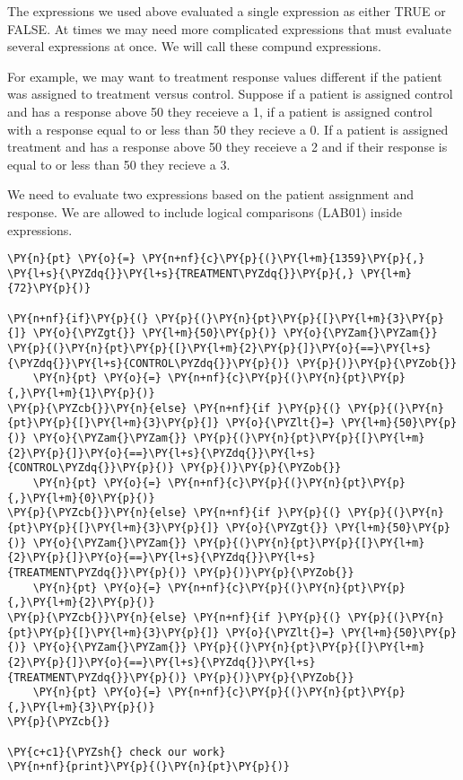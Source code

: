 The expressions we used above evaluated a single expression as either
TRUE or FALSE. At times we may need more complicated expressions that
must evaluate several expressions at once. We will call these compund
expressions.

For example, we may want to treatment response values different if the
patient was assigned to treatment versus control. Suppose if a patient
is assigned control and has a response above 50 they receieve a 1, if a
patient is assigned control with a response equal to or less than 50
they recieve a 0. If a patient is assigned treatment and has a response
above 50 they receieve a 2 and if their response is equal to or less
than 50 they recieve a 3.

We need to evaluate two expressions based on the patient assignment and
response. We are allowed to include logical comparisons (LAB01) inside
expressions.

    \begin{tcolorbox}[breakable, size=fbox, boxrule=1pt, pad at break*=1mm,colback=cellbackground, colframe=cellborder]
\begin{Verbatim}[commandchars=\\\{\}]
\PY{n}{pt} \PY{o}{=} \PY{n+nf}{c}\PY{p}{(}\PY{l+m}{1359}\PY{p}{,} \PY{l+s}{\PYZdq{}}\PY{l+s}{TREATMENT\PYZdq{}}\PY{p}{,} \PY{l+m}{72}\PY{p}{)}

\PY{n+nf}{if}\PY{p}{(} \PY{p}{(}\PY{n}{pt}\PY{p}{[}\PY{l+m}{3}\PY{p}{]} \PY{o}{\PYZgt{}} \PY{l+m}{50}\PY{p}{)} \PY{o}{\PYZam{}\PYZam{}} \PY{p}{(}\PY{n}{pt}\PY{p}{[}\PY{l+m}{2}\PY{p}{]}\PY{o}{==}\PY{l+s}{\PYZdq{}}\PY{l+s}{CONTROL\PYZdq{}}\PY{p}{)} \PY{p}{)}\PY{p}{\PYZob{}} 
    \PY{n}{pt} \PY{o}{=} \PY{n+nf}{c}\PY{p}{(}\PY{n}{pt}\PY{p}{,}\PY{l+m}{1}\PY{p}{)}
\PY{p}{\PYZcb{}}\PY{n}{else} \PY{n+nf}{if }\PY{p}{(} \PY{p}{(}\PY{n}{pt}\PY{p}{[}\PY{l+m}{3}\PY{p}{]} \PY{o}{\PYZlt{}=} \PY{l+m}{50}\PY{p}{)} \PY{o}{\PYZam{}\PYZam{}} \PY{p}{(}\PY{n}{pt}\PY{p}{[}\PY{l+m}{2}\PY{p}{]}\PY{o}{==}\PY{l+s}{\PYZdq{}}\PY{l+s}{CONTROL\PYZdq{}}\PY{p}{)} \PY{p}{)}\PY{p}{\PYZob{}}
    \PY{n}{pt} \PY{o}{=} \PY{n+nf}{c}\PY{p}{(}\PY{n}{pt}\PY{p}{,}\PY{l+m}{0}\PY{p}{)}
\PY{p}{\PYZcb{}}\PY{n}{else} \PY{n+nf}{if }\PY{p}{(} \PY{p}{(}\PY{n}{pt}\PY{p}{[}\PY{l+m}{3}\PY{p}{]} \PY{o}{\PYZgt{}} \PY{l+m}{50}\PY{p}{)} \PY{o}{\PYZam{}\PYZam{}} \PY{p}{(}\PY{n}{pt}\PY{p}{[}\PY{l+m}{2}\PY{p}{]}\PY{o}{==}\PY{l+s}{\PYZdq{}}\PY{l+s}{TREATMENT\PYZdq{}}\PY{p}{)} \PY{p}{)}\PY{p}{\PYZob{}}
    \PY{n}{pt} \PY{o}{=} \PY{n+nf}{c}\PY{p}{(}\PY{n}{pt}\PY{p}{,}\PY{l+m}{2}\PY{p}{)}
\PY{p}{\PYZcb{}}\PY{n}{else} \PY{n+nf}{if }\PY{p}{(} \PY{p}{(}\PY{n}{pt}\PY{p}{[}\PY{l+m}{3}\PY{p}{]} \PY{o}{\PYZlt{}=} \PY{l+m}{50}\PY{p}{)} \PY{o}{\PYZam{}\PYZam{}} \PY{p}{(}\PY{n}{pt}\PY{p}{[}\PY{l+m}{2}\PY{p}{]}\PY{o}{==}\PY{l+s}{\PYZdq{}}\PY{l+s}{TREATMENT\PYZdq{}}\PY{p}{)} \PY{p}{)}\PY{p}{\PYZob{}}
    \PY{n}{pt} \PY{o}{=} \PY{n+nf}{c}\PY{p}{(}\PY{n}{pt}\PY{p}{,}\PY{l+m}{3}\PY{p}{)}
\PY{p}{\PYZcb{}}

\PY{c+c1}{\PYZsh{} check our work}
\PY{n+nf}{print}\PY{p}{(}\PY{n}{pt}\PY{p}{)}
\end{Verbatim}
\end{tcolorbox}

